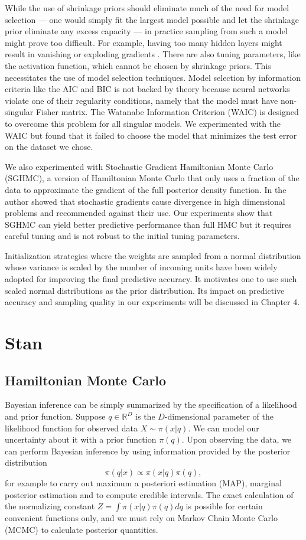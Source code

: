 \documentclass[12pt]{report}
\begin{document}
While the use of shrinkage priors should eliminate much of the need for model selection --- one would simply fit the largest model possible and let the shrinkage prior eliminate any excess capacity --- in practice sampling from such a model might prove too difficult. For example, having too many hidden layers might result in vanishing or exploding gradients \cite{bengio1994learning}. There are also tuning parameters, like the activation function, which cannot be chosen by shrinkage priors. This necessitates the use of model selection techniques. Model selection by information criteria like the AIC and BIC is not backed by theory because neural networks violate one of their regularity conditions, namely that the model must have non-singular Fisher matrix. The Watanabe Information Criterion (WAIC) is designed to overcome this problem for all singular models. We experimented with the WAIC but found that it failed to choose the model that minimizes the test error on the dataset we chose. 

We also experimented with Stochastic Gradient Hamiltonian Monte Carlo (SGHMC), a version of Hamiltonian Monte Carlo that only uses a fraction of the data to approximate the gradient of the full posterior density function. In \cite{betancourt2015fundamental} the author showed that stochastic gradients cause divergence in high dimensional problems and recommended against their use. Our experiments show that SGHMC can yield better predictive performance than full HMC but it requires careful tuning and is not robust to the initial tuning parameters. 

Initialization strategies where the weights are sampled from a normal distribution whose variance is scaled by the number of incoming units have been widely adopted for improving the final predictive accuracy. It motivates one to use such scaled normal distributions as the prior distribution. Its impact on predictive accuracy and sampling quality in our experiments will be discussed in Chapter 4. 

\chapter{Stan}
\section{Hamiltonian Monte Carlo}

Bayesian inference can be simply summarized by the specification of a likelihood and prior function. Suppose $q \in \mathbb{R}^D$ is the $D$-dimensional parameter of the likelihood function for observed data $X \sim \pi(x|q)$. We can
model our uncertainty about it with a prior function $\pi(q)$. Upon observing the data, we can perform Bayesian inference by using information provided by the posterior distribution 
\[ \pi(q | x ) \propto \pi(x | q) \pi(q) ,\]
for example to carry out maximum a posteriori estimation (MAP), marginal posterior estimation and to compute credible intervals. The exact calculation of the normalizing constant $Z = \int \pi(x | q) \pi(q) dq $ is possible for certain convenient functions only, and we must rely on Markov Chain Monte Carlo (MCMC) to calculate posterior quantities. 
\end{document}
